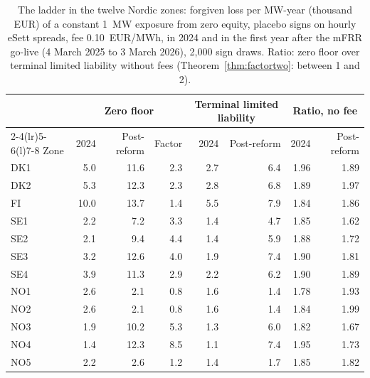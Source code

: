 \begin{table}[!htbp]
\centering
\caption{The ladder in the twelve Nordic zones: forgiven loss per MW-year (thousand EUR) of a constant 1~MW exposure from zero equity, placebo signs on hourly eSett spreads, fee 0.10~EUR/MWh, in 2024 and in the first year after the mFRR go-live (4 March 2025 to 3 March 2026), 2,000 sign draws. Ratio: zero floor over terminal limited liability without fees (Theorem~\ref{thm:factortwo}: between 1 and 2).}
\label{tab:ladder12}
\scriptsize
\begin{tabular}{@{}lrrrrrrr@{}}
\toprule
& \multicolumn{3}{c}{Zero floor} & \multicolumn{2}{c}{Terminal limited liability} & \multicolumn{2}{c}{Ratio, no fee} \\
\cmidrule(lr){2-4}\cmidrule(lr){5-6}\cmidrule(l){7-8}
Zone & 2024 & Post-reform & Factor & 2024 & Post-reform & 2024 & Post-reform \\
\midrule
DK1 & 5.0 & 11.6 & 2.3 & 2.7 & 6.4 & 1.96 & 1.89 \\
DK2 & 5.3 & 12.3 & 2.3 & 2.8 & 6.8 & 1.89 & 1.97 \\
FI & 10.0 & 13.7 & 1.4 & 5.5 & 7.9 & 1.84 & 1.86 \\
SE1 & 2.2 & 7.2 & 3.3 & 1.4 & 4.7 & 1.85 & 1.62 \\
SE2 & 2.1 & 9.4 & 4.4 & 1.4 & 5.9 & 1.88 & 1.72 \\
SE3 & 3.2 & 12.6 & 4.0 & 1.9 & 7.4 & 1.90 & 1.81 \\
SE4 & 3.9 & 11.3 & 2.9 & 2.2 & 6.2 & 1.90 & 1.89 \\
NO1 & 2.6 & 2.1 & 0.8 & 1.6 & 1.4 & 1.78 & 1.93 \\
NO2 & 2.6 & 2.1 & 0.8 & 1.6 & 1.4 & 1.84 & 1.99 \\
NO3 & 1.9 & 10.2 & 5.3 & 1.3 & 6.0 & 1.82 & 1.67 \\
NO4 & 1.4 & 12.3 & 8.5 & 1.1 & 7.4 & 1.95 & 1.73 \\
NO5 & 2.2 & 2.6 & 1.2 & 1.4 & 1.7 & 1.85 & 1.82 \\
\bottomrule
\end{tabular}
\end{table}
